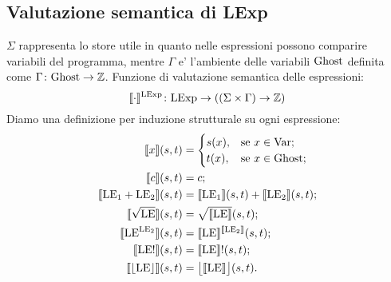 \subsection{Valutazione semantica di LExp}
$\Sigma$ rappresenta lo store utile in quanto nelle espressioni possono comparire variabili del programma, mentre $\Gamma$ e' l'ambiente delle variabili $\mathrm{Ghost}$ definita come $\mathord{\Gamma}\colon\mathrm{Ghost}\to\mathbb{Z}$. Funzione di valutazione semantica delle espressioni:
\[
   \mathord{\llbracket \cdot \rrbracket ^{\mathrm{LExp}}}\colon\mathrm{LExp}\to((\Sigma \times \Gamma) \rightarrow \mathbb{Z})
\]
Diamo una definizione per induzione strutturale su ogni espressione:
\begin{align*}
   \llbracket x \rrbracket(s,t)
      &=
        \begin{cases}
                 s(x), &\text{se $x \in \mathrm{Var}$};\\
                 t(x), &\text{se $x \in \mathrm{Ghost}$};
        \end{cases}\\
   \llbracket  c \rrbracket(s,t)
     &=  c;\\
   \llbracket \mathrm{LE}_1 + \mathrm{LE}_2 \rrbracket(s,t)
     &= \llbracket \mathrm{LE}_1 \rrbracket(s,t) + \llbracket \mathrm{LE}_2 \rrbracket(s,t);\\
   \llbracket \sqrt{\mathrm{LE}} \rrbracket(s,t)
     &= \sqrt{\llbracket \mathrm{LE} \rrbracket}(s,t);\\
   \llbracket \mathrm{LE}^{\mathrm{LE}_2} \rrbracket(s,t)
     &= \llbracket \mathrm{LE} \rrbracket^{\llbracket \mathrm{LE}_2 \rrbracket}(s,t);\\
   \llbracket \mathrm{LE}! \rrbracket(s,t)
     &= \llbracket \mathrm{LE} \rrbracket!(s,t);\\
   \llbracket \lfloor \mathrm{LE} \rfloor \rrbracket(s,t)
     &= \bigl \lfloor \llbracket \mathrm{LE} \rrbracket \bigr \rfloor(s,t).
\end{align*}

